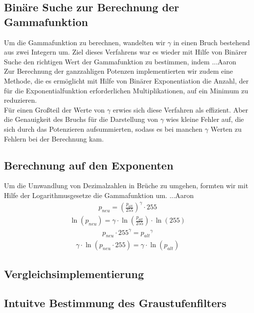 \documentclass[course=erap]{aspdoc}
\begin{document}
\subsection{Binäre Suche zur Berechnung der Gammafunktion}
Um die Gammafunktion zu berechnen, wandelten wir  $\gamma$ in einen Bruch bestehend aus zwei Integern um. Ziel dieses Verfahrens war es wieder mit Hilfe von Binärer Suche den richtigen Wert der Gammafunktion zu bestimmen, indem ...Aaron
\\
\newline
\noindent	
Zur Berechnung der ganzzahligen Potenzen implementierten wir zudem eine Methode, die es ermöglicht mit Hilfe von Binärer Exponentiation die Anzahl, der für die Exponentialfunktion erforderlichen Multiplikationen, auf ein Minimum zu reduzieren. 
\\
\newline
\noindent		 
Für einen Großteil der Werte von $\gamma$ erwies sich diese Verfahren als effizient. Aber die Genauigkeit des Bruchs für die Darstellung von $\gamma$ wies kleine Fehler auf, die sich durch das Potenzieren aufsummierten, sodass es bei manchen $\gamma$ Werten zu Fehlern bei der Berechnung kam.       

\subsection{Berechnung auf den Exponenten}
Um die Umwandlung von Dezimalzahlen in Brüche zu umgehen, formten wir mit Hilfe der Logarithmusgesetze die Gammafunktion um. ...Aaron
\begin{align}	
p_{neu} = \left(\frac{p_{alt}}{255}\right)^{\gamma} \cdot 255
\end{align}
\begin{align}	
\ln (p_{neu}) = \gamma \cdot \ln\left(\frac{p_{alt}}{255}\right) \cdot \ln(255)
\end{align}
\begin{align}
p_{neu} \cdot 255^\gamma = {p_{alt}}^{\gamma}
\end{align}
\begin{align}
\gamma \cdot \ln ( p_{neu} \cdot 255) = \gamma \cdot \ln({p_{alt}})
\end{align}

\subsection{Vergleichsimplementierung}
\subsection{Intuitve Bestimmung des Graustufenfilters}
\end{document}
